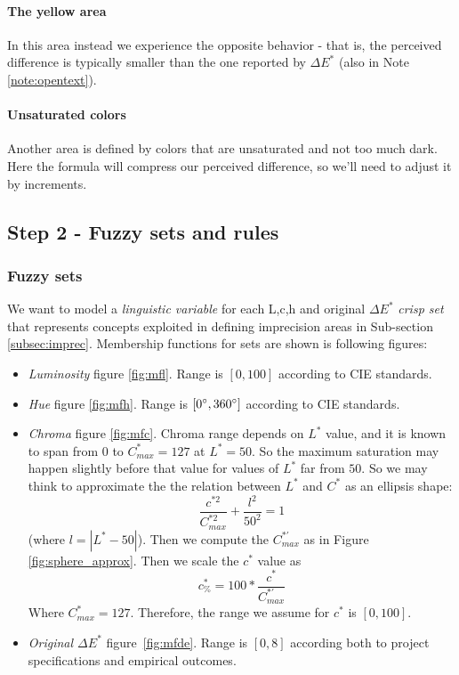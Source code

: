 \documentclass[twocolumn,a4paper]{article}
\begin{document}
\paragraph{The yellow area} In this area instead we experience the opposite behavior - that is, the perceived difference is typically smaller than the one reported by $\Delta E^*$ (also in Note \ref{note:opentext}).
\paragraph{Unsaturated colors} Another area is defined by colors that are unsaturated and not too much dark. Here the formula will compress our perceived difference, so we'll need to adjust it by increments.
\subsection{Step 2 - Fuzzy sets and rules}
\subsubsection{Fuzzy sets} We want to model a \textit{linguistic variable} for each L,c,h and original $\Delta E^{*}$ \textit{crisp set} that represents concepts exploited in defining imprecision areas in Sub-section \ref{subsec:imprec}. Membership functions for sets are shown is following figures:
\begin{itemize}
	\item \textit{Luminosity} figure \ref{fig:mfl}. Range is $[0,100]$ according to CIE standards.
	\item \textit{Hue} figure \ref{fig:mfh}. Range is $[0\degree ,360\degree]$ according to CIE standards.
	\item \textit{Chroma} figure \ref{fig:mfc}. Chroma range depends on $L^*$ value, and it is known to span from $0$ to $C^{*}_{max} = 127$ at $L^*=50$.
	So the maximum saturation may happen slightly before that value for values of $L^*$ far from $50$. So we may think to approximate the the relation between $L^*$ and $C^*$ as an ellipsis shape: \[ \frac{c^{*2}}{C^{*2}_{max}}+\frac{l^2}{50^2} = 1  \] (where $l = \left | L^* -50 \right |$). Then we compute the $C^{*'}_{max}$ as in Figure \ref{fig:sphere_approx}. Then we scale the $c^*$ value as \[c^{*}_{\%} = 100*\frac{c^*}{C^{*'}_{max}}\]
	Where $C^{*}_{max} = 127$. Therefore, the range we assume for $c^{*}$ is $[0,100]$.
	\item \textit{Original $\Delta E^{*}$} figure~\ref{fig:mfde}. Range is $[0,8]$ according both to project specifications and empirical outcomes.
\end{itemize}
\end{document}
